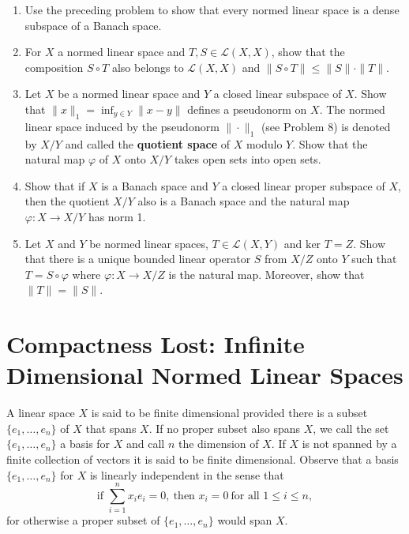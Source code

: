 \begin{enumerate}
    \item Use the preceding problem to show that every normed linear space is a dense subspace of a Banach space.
    \item For $X$ a normed linear space and $T,S\in\mathcal{L}(X,X)$, show that the composition $S\circ T$ also belongs to $\mathcal{L}(X,X)$ and $\|S\circ T\|\le\|S\|\cdot\|T\|$.
    \item Let $X$ be a normed linear space and $Y$ a closed linear subspace of $X$.
    Show that $\|x\|_1=\inf_{y\in Y}\|x-y\|$ defines a pseudonorm on $X$.
    The normed linear space induced by the pseudonorm $\|\cdot\|_1$ (see Problem 8) is denoted by $X/Y$ and called the \textbf{quotient space} of $X$ modulo $Y$.
    Show that the natural map $\varphi$ of $X$ onto $X/Y$ takes open sets into open sets.
    \item Show that if $X$ is a Banach space and $Y$ a closed linear proper subspace of $X$, then the quotient $X/Y$ also is a Banach space and the natural map $\varphi:X\to X/Y$ has norm 1.
    \item Let $X$ and $Y$ be normed linear spaces, $T\in\mathcal{L}(X,Y)$ and $\text{ker }T=Z$.
    Show that there is a unique bounded linear operator $S$ from $X/Z$ onto $Y$ such that $T=S\circ\varphi$ where $\varphi:X\to X/Z$ is the natural map.
    Moreover, show that $\|T\|=\|S\|$.
\end{enumerate}

\section{Compactness Lost: Infinite Dimensional Normed Linear Spaces}

A linear space $X$ is said to be finite dimensional provided there is a subset $\{e_1,\dots,e_n\}$ of $X$ that spans $X$.
If no proper subset also spans $X$, we call the set $\{e_1,\dots,e_n\}$ a basis for $X$ and call $n$ the dimension of $X$.
If $X$ is not spanned by a finite collection of vectors it is said to be finite dimensional.
Observe that a basis $\{e_1,\dots,e_n\}$ for $X$ is linearly independent in the sense that 
\[
    \text{if }\sum_{i=1}^nx_ie_i=0,\ \text{then }x_i=0\ \text{for all }1\le i\le n,
\]
for otherwise a proper subset of $\{e_1,\dots,e_n\}$ would span $X$.

